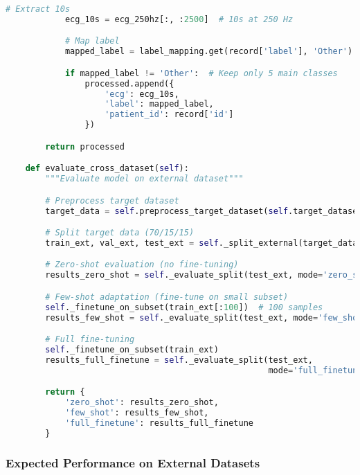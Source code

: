 \documentclass[11pt]{article}
\begin{document}
\begin{lstlisting}[language=python, caption=External Validation Framework]
            # Extract 10s
            ecg_10s = ecg_250hz[:, :2500]  # 10s at 250 Hz

            # Map label
            mapped_label = label_mapping.get(record['label'], 'Other')

            if mapped_label != 'Other':  # Keep only 5 main classes
                processed.append({
                    'ecg': ecg_10s,
                    'label': mapped_label,
                    'patient_id': record['id']
                })

        return processed

    def evaluate_cross_dataset(self):
        """Evaluate model on external dataset"""

        # Preprocess target dataset
        target_data = self.preprocess_target_dataset(self.target_dataset)

        # Split target data (70/15/15)
        train_ext, val_ext, test_ext = self._split_external(target_data)

        # Zero-shot evaluation (no fine-tuning)
        results_zero_shot = self._evaluate_split(test_ext, mode='zero_shot')

        # Few-shot adaptation (fine-tune on small subset)
        self._finetune_on_subset(train_ext[:100])  # 100 samples
        results_few_shot = self._evaluate_split(test_ext, mode='few_shot')

        # Full fine-tuning
        self._finetune_on_subset(train_ext)
        results_full_finetune = self._evaluate_split(test_ext,
                                                     mode='full_finetune')

        return {
            'zero_shot': results_zero_shot,
            'few_shot': results_few_shot,
            'full_finetune': results_full_finetune
        }
\end{lstlisting}

\subsubsection{Expected Performance on External Datasets}
\end{document}
